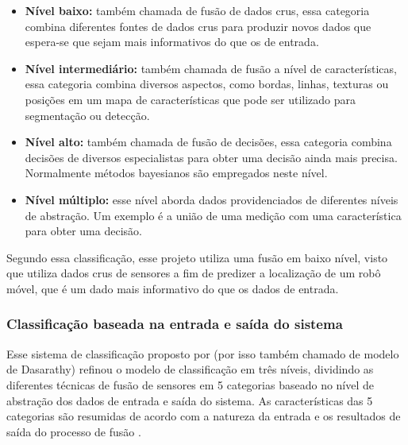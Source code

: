 \documentclass[acronym, symbols, table, deposito]{fei}
\begin{document}
				\begin{itemize}
					\item \textbf{Nível baixo:} também chamada de fusão de dados crus, essa categoria combina diferentes fontes de dados crus para produzir novos dados que espera-se que sejam mais informativos do que os de entrada.
					
					\item \textbf{Nível intermediário:} também chamada de fusão a nível de características, essa categoria combina diversos aspectos, como bordas, linhas, texturas ou posições em um mapa de características que pode ser utilizado para segmentação ou detecção.
					
					\item \textbf{Nível alto:} também chamada de fusão de decisões, essa categoria combina decisões de diversos especialistas para obter uma decisão ainda mais precisa. Normalmente métodos bayesianos são empregados neste nível.
					
					\item \textbf{Nível múltiplo:} esse nível aborda dados providenciados de diferentes níveis de abstração. Um exemplo é a união de uma medição com uma característica para obter uma decisão.
				\end{itemize}
				
				Segundo essa classificação, esse projeto utiliza uma fusão em baixo nível, visto que utiliza dados crus de sensores a fim de predizer a localização de um robô móvel, que é um dado mais informativo do que os dados de entrada.
			
			\subsubsection{Classificação baseada na entrada e saída do sistema}
			
				Esse sistema de classificação proposto por \textcite{dasarathy1997sensor} (por isso também chamado de modelo de Dasarathy) refinou o modelo de classificação em três níveis, dividindo as diferentes técnicas de fusão de sensores em 5 categorias baseado no nível de abstração dos dados de entrada e saída do sistema. As características das 5 categorias são resumidas de acordo com a natureza da entrada e os resultados de saída do processo de fusão \cite{li2021data, vakil2021survey}. 
				
\end{document}
